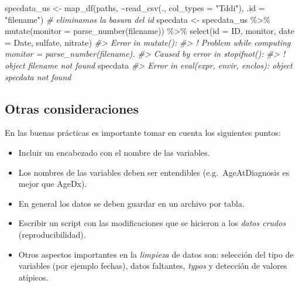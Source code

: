 \documentclass[
]{book}
\newenvironment{Shaded}{\begin{snugshade}}{\end{snugshade}}
\newcommand{\AttributeTok}[1]{\textcolor[rgb]{0.77,0.63,0.00}{#1}}
\newcommand{\CommentTok}[1]{\textcolor[rgb]{0.56,0.35,0.01}{\textit{#1}}}
\newcommand{\FunctionTok}[1]{\textcolor[rgb]{0.00,0.00,0.00}{#1}}
\newcommand{\NormalTok}[1]{#1}
\newcommand{\OtherTok}[1]{\textcolor[rgb]{0.56,0.35,0.01}{#1}}
\newcommand{\SpecialCharTok}[1]{\textcolor[rgb]{0.00,0.00,0.00}{#1}}
\newcommand{\StringTok}[1]{\textcolor[rgb]{0.31,0.60,0.02}{#1}}
\begin{document}
\begin{Shaded}
\begin{Highlighting}[]
\NormalTok{specdata\_us }\OtherTok{\textless{}{-}} \FunctionTok{map\_df}\NormalTok{(paths, }\SpecialCharTok{\textasciitilde{}}\FunctionTok{read\_csv}\NormalTok{(., }\AttributeTok{col\_types =} \StringTok{"Tddi"}\NormalTok{), }\AttributeTok{.id =} \StringTok{"filename"}\NormalTok{)}
\CommentTok{\# eliminamos la basura del id}
\NormalTok{specdata }\OtherTok{\textless{}{-}}\NormalTok{ specdata\_us }\SpecialCharTok{\%\textgreater{}\%}
  \FunctionTok{mutate}\NormalTok{(}\AttributeTok{monitor =} \FunctionTok{parse\_number}\NormalTok{(filename)) }\SpecialCharTok{\%\textgreater{}\%}
  \FunctionTok{select}\NormalTok{(}\AttributeTok{id =}\NormalTok{ ID, monitor, }\AttributeTok{date =}\NormalTok{ Date, sulfate, nitrate)}
\CommentTok{\#\textgreater{} Error in \textasciigrave{}mutate()\textasciigrave{}:}
\CommentTok{\#\textgreater{} ! Problem while computing \textasciigrave{}monitor = parse\_number(filename)\textasciigrave{}.}
\CommentTok{\#\textgreater{} Caused by error in \textasciigrave{}stopifnot()\textasciigrave{}:}
\CommentTok{\#\textgreater{} ! object \textquotesingle{}filename\textquotesingle{} not found}
\NormalTok{specdata}
\CommentTok{\#\textgreater{} Error in eval(expr, envir, enclos): object \textquotesingle{}specdata\textquotesingle{} not found}
\end{Highlighting}
\end{Shaded}

\hypertarget{otras-consideraciones}{%
\subsection*{Otras consideraciones}\label{otras-consideraciones}}

En las buenas prácticas es importante tomar en cuenta los siguientes puntos:

\begin{itemize}
\item
  Incluir un encabezado con el nombre de las variables.
\item
  Los nombres de las variables deben ser entendibles (e.g.~AgeAtDiagnosis es
  mejor que AgeDx).
\item
  En general los datos se deben guardar en un archivo por tabla.
\item
  Escribir un script con las modificaciones que se hicieron a los \emph{datos crudos}
  (reproducibilidad).
\item
  Otros aspectos importantes en la \emph{limpieza} de datos son: selección del tipo
  de variables (por ejemplo fechas), datos faltantes, \emph{typos} y detección de
  valores atípicos.
\end{itemize}
\end{document}
